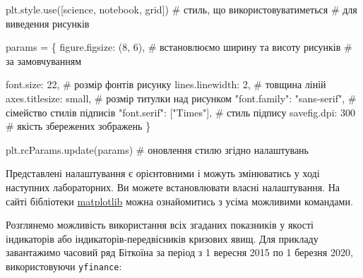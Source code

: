 \documentclass[
  letterpaper,
]{report}
\newenvironment{Shaded}{\begin{snugshade}}{\end{snugshade}}
\newcommand{\CommentTok}[1]{\textcolor[rgb]{0.37,0.37,0.37}{#1}}
\newcommand{\DecValTok}[1]{\textcolor[rgb]{0.68,0.00,0.00}{#1}}
\newcommand{\NormalTok}[1]{\textcolor[rgb]{0.00,0.23,0.31}{#1}}
\newcommand{\OperatorTok}[1]{\textcolor[rgb]{0.37,0.37,0.37}{#1}}
\newcommand{\StringTok}[1]{\textcolor[rgb]{0.13,0.47,0.30}{#1}}
\begin{document}
\begin{Shaded}
\begin{Highlighting}[]
\NormalTok{plt.style.use([}\StringTok{\textquotesingle{}science\textquotesingle{}}\NormalTok{, }\StringTok{\textquotesingle{}notebook\textquotesingle{}}\NormalTok{, }\StringTok{\textquotesingle{}grid\textquotesingle{}}\NormalTok{]) }\CommentTok{\# стиль, що використовуватиметься}
                                               \CommentTok{\# для виведення рисунків}

\NormalTok{params }\OperatorTok{=}\NormalTok{ \{}
    \StringTok{\textquotesingle{}figure.figsize\textquotesingle{}}\NormalTok{: (}\DecValTok{8}\NormalTok{, }\DecValTok{6}\NormalTok{),         }\CommentTok{\# встановлюємо ширину та висоту рисунків }
                                      \CommentTok{\# за замовчуванням}
        
    \StringTok{\textquotesingle{}font.size\textquotesingle{}}\NormalTok{: }\DecValTok{22}\NormalTok{,                  }\CommentTok{\# розмір фонтів рисунку}
    \StringTok{\textquotesingle{}lines.linewidth\textquotesingle{}}\NormalTok{: }\DecValTok{2}\NormalTok{,             }\CommentTok{\# товщина ліній}
    \StringTok{\textquotesingle{}axes.titlesize\textquotesingle{}}\NormalTok{: }\StringTok{\textquotesingle{}small\textquotesingle{}}\NormalTok{,        }\CommentTok{\# розмір титулки над рисунком}
    \StringTok{"font.family"}\NormalTok{: }\StringTok{"sans{-}serif"}\NormalTok{,      }\CommentTok{\# сімейство стилів підписів }
    \StringTok{"font.serif"}\NormalTok{: [}\StringTok{"Times"}\NormalTok{],          }\CommentTok{\# стиль підпису}
    \StringTok{\textquotesingle{}savefig.dpi\textquotesingle{}}\NormalTok{: }\DecValTok{300}                \CommentTok{\# якість збережених зображень}
\NormalTok{\}}

\NormalTok{plt.rcParams.update(params)           }\CommentTok{\# оновлення стилю згідно налаштувань}
\end{Highlighting}
\end{Shaded}

Представлені налаштування є орієнтовними і можуть змінюватись у ході
наступних лабораторних. Ви можете встановлювати власні налаштування. На
сайті бібліотеки
\href{https://matplotlib.org/stable/api/matplotlib_configuration_api.html}{matplotlib}
можна ознайомитись з усіма можливими командами.

Розглянемо можливість використання всіх згаданих показників у якості
індикаторів або індикаторів-передвісників кризових явищ. Для прикладу
завантажимо часовий ряд Біткоїна за період з 1 вересня 2015 по 1 березня
2020, використовуючи \texttt{yfinance}:
\end{document}
